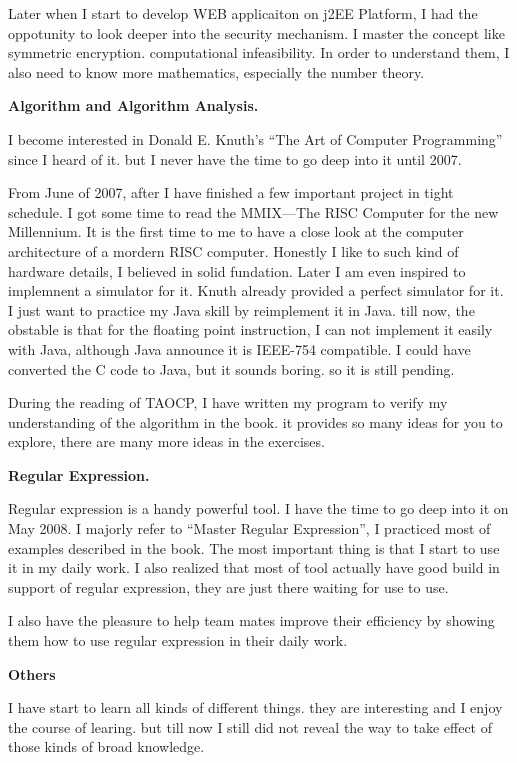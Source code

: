 Later when I start to develop WEB applicaiton on j2EE Platform, I had the 
oppotunity to look deeper into the security mechanism. I master the concept like
symmetric encryption. computational infeasibility. In order to understand them,
I also need to know more mathematics, especially the number theory.

\medskip\noindent
{\bf Algorithm and Algorithm Analysis.}

I become interested in Donald E. Knuth's ``The Art of Computer Programming'' 
since I heard of it. but I never have the time to go deep into it until 2007.

From June of 2007, after I have finished a few important project in tight 
schedule. I got some time to read the MMIX---The RISC Computer for the new 
Millennium. It is the first time to me to have a close look at the computer 
architecture of a mordern RISC computer. Honestly I like to such kind of 
hardware details, I believed in solid fundation. Later I am even inspired to 
implemnent a simulator for it. Knuth already provided a perfect simulator for 
it. I just want to practice my Java skill by reimplement it in Java. till now, 
the obstable is that for the floating point instruction, I can not implement it
easily with Java, although Java announce it is IEEE-754 compatible.   I could 
have converted the C code to Java, but it sounds  boring. so it is still
 pending. 
 
During the reading of TAOCP, I have written my program to verify my 
understanding
of the algorithm in the book. it provides so many ideas for you to explore, 
there are many more ideas in the exercises. 

\medskip\noindent
{\bf Regular Expression.}

Regular expression is a handy powerful tool. I have the time to go deep into it
on May 2008. I majorly refer to ``Master Regular Expression'', I practiced most 
of examples described in the book. The most important thing is that I start to
use it in my daily work. I also realized that most of tool actually have good 
build in
support of regular expression, they are just there waiting for use to use.

I also have the pleasure to help team mates improve their efficiency by showing 
them how to use regular expression in their daily work.

\medskip\noindent
{\bf Others}

I have start to learn all kinds of different things. they are interesting and I
enjoy the course of learing. but till now I still did not reveal the way to 
take effect of those kinds of broad knowledge.   
 
 \bye
